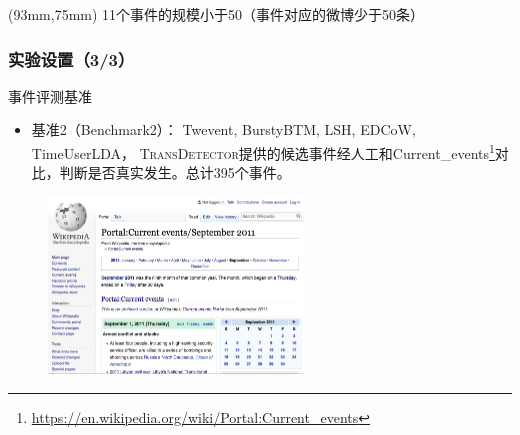 \begin{frame}
\begin{textblock*}{25mm}(93mm,75mm)
\noindent \tiny{11个事件的规模小于50（事件对应的微博少于50条）}
\end{textblock*}
\end{frame}

\begin{frame}
\frametitle{\noindent 实验设置（3/3）}
\noindent 事件评测基准
\begin{itemize}
	\item 基准2（Benchmark2）： Twevent, BurstyBTM, LSH, EDCoW, TimeUserLDA， \textsc{TransDetector}提供的候选事件经人工和Current\_events\footnote{\tiny{\url{https://en.wikipedia.org/wiki/Portal:Current_events}}}对比，判断是否真实发生。总计{\color{red}395}个事件。
\end{itemize}
\vspace{-0.15cm}
\begin{figure}
\centering
\includegraphics[height=4.7cm]{img/current_events.jpg}
\end{figure}
\end{frame}


